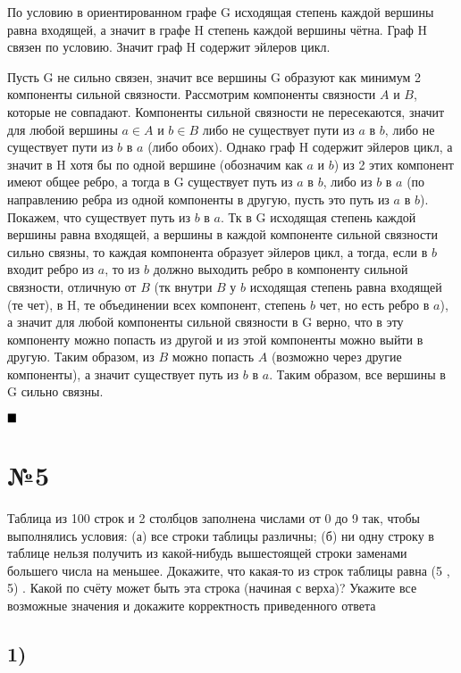 \documentclass[a4paper, 16pt]{article}
\newenvironment{proof}[1][Доказательство]{%
	\begin{trivlist}
		\item[\hskip \labelsep {\bfseries #1:}]
		\item \hspace{14pt}
	}{
		$ \hfill\blacksquare $
	\end{trivlist}
	\hfill\break
}
\begin{document}
		\begin{proof}
			По условию в ориентированном графе
			G
			исходящая степень каждой вершины равна входящей, а значит в графе H степень каждой вершины чётна. Граф H связен по условию. Значит граф H содержит эйлеров цикл. 
				
				Пусть G не сильно связен, значит все вершины G образуют как минимум 2 компоненты сильной связности. Рассмотрим компоненты связности $A$ и $B$, которые не совпадают. Компоненты сильной связности не пересекаются, значит для любой вершины $a \in A$ и $b \in B$ либо не существует пути из $a$ в $b$, либо не существует пути из $b$ в $a$ (либо обоих). Однако граф H содержит эйлеров цикл, а значит в H хотя бы по одной вершине (обозначим как $a$ и $b$) из 2 этих компонент имеют общее ребро, а тогда в G существует путь из $a$ в $b$, либо из $b$ в $a$ (по направлению ребра из одной компоненты в другую, пусть это путь из $a$ в $b$). Покажем, что существует путь из $b$ в $a$. Тк в G исходящая степень каждой вершины равна входящей, а вершины в каждой компоненте сильной связности сильно связны, то каждая компонента образует эйлеров цикл, а тогда, если в $b$ входит ребро из $a$, то из $b$ должно выходить ребро в компоненту сильной связности, отличную от $B$ (тк внутри $B$ у $b$ исходящая степень равна входящей (те чет), в H, те объединении всех компонент, степень $b$ чет, но есть ребро в $a$), а значит для любой компоненты сильной связности в G верно, что в эту компоненту можно попасть из другой и из этой компоненты можно выйти в другую. Таким образом, из $B$ можно попасть $A$ (возможно через другие компоненты), а значит существует путь из $b$ в $a$. Таким образом, все вершины в G сильно связны.
		\end{proof}
	
	\section*{№5}
	
		Таблица из 100 строк и 2 столбцов заполнена числами от 0 до 9 так, чтобы выполнялись условия:
		(а) все строки таблицы различны; (б) ни одну строку в таблице нельзя получить из какой-нибудь вышестоящей строки заменами большего числа на меньшее. Докажите, что какая-то из строк таблицы равна
		(5
		,
		5)
		. Какой по счёту может быть эта строка (начиная с верха)? Укажите все возможные значения и
		докажите корректность приведенного ответа
		
		\subsection*{1)}
		
\end{document}
